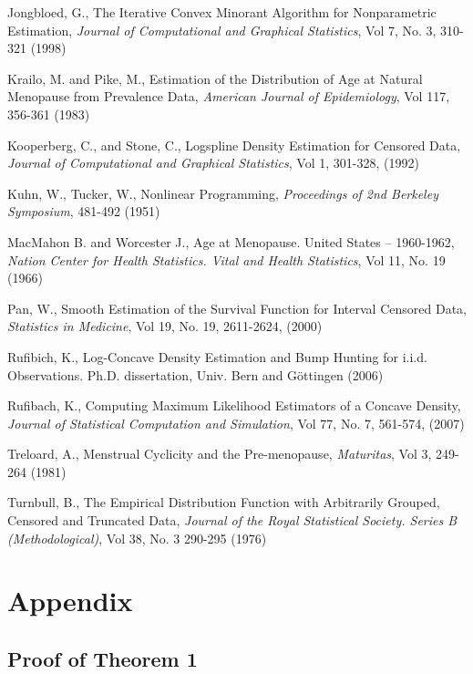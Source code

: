 \begin{thebibliography}{}
Jongbloed, G., The Iterative Convex Minorant Algorithm for Nonparametric Estimation, \emph{Journal of Computational and Graphical Statistics}, Vol 7, No. 3, 310-321 (1998)

Krailo, M. and Pike, M., Estimation of the Distribution of Age at Natural Menopause from Prevalence Data, \emph{American Journal of Epidemiology}, Vol 117, 356-361 (1983)



Kooperberg, C., and Stone, C., Logspline Density Estimation for Censored Data, \emph{Journal of Computational and Graphical Statistics}, Vol 1, 301-328, (1992)

Kuhn, W., Tucker, W., Nonlinear Programming, \emph{Proceedings of 2nd Berkeley Symposium}, 481-492 (1951)

MacMahon B. and Worcester J., Age at Menopause. United States -- 1960-1962, \emph{Nation Center for Health Statistics. Vital and Health Statistics}, Vol 11, No. 19 (1966)


Pan, W., Smooth Estimation of the Survival Function for Interval Censored Data, \emph{Statistics in Medicine}, Vol 19, No. 19, 2611-2624,  (2000)

Rufibich, K., Log-Concave Density Estimation and Bump Hunting for i.i.d. Observations. Ph.D. dissertation, Univ. Bern and G\"ottingen (2006)


Rufibach, K., Computing Maximum Likelihood Estimators of a Concave Density, \emph{Journal of Statistical Computation and Simulation}, Vol 77, No. 7, 561-574, (2007)

Treloard, A., Menstrual Cyclicity and the Pre-menopause, \emph{Maturitas}, Vol 3, 249-264 (1981)


Turnbull, B., The Empirical Distribution Function with Arbitrarily Grouped, Censored and Truncated Data, \emph{Journal of the Royal Statistical Society. Series B (Methodological)}, Vol 38, No. 3 290-295 (1976)


\end{thebibliography}




{\section{Appendix} } 	
\label{sec:10}
	\subsection{Proof of Theorem 1}
	
